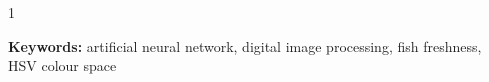 \begin{spacing}{1}
\vspace{3\baselineskip}

\noindent
\textbf{Keywords:} artificial neural network, digital image processing,
fish freshness, HSV colour space
\end{spacing}
